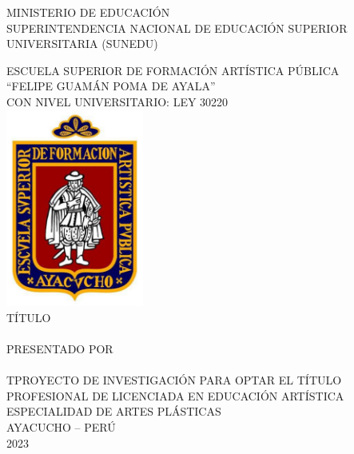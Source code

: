 \documentclass[12pt,a4paper]{article}
\begin{document}
\setlength{\abovecaptionskip}{0pt}
\setlength{\belowcaptionskip}{0pt}

\thispagestyle{empty}

	{\normalsize\centering\thispagestyle{empty} MINISTERIO DE EDUCACIÓN{}\\  SUPERINTENDENCIA NACIONAL DE EDUCACIÓN SUPERIOR UNIVERSITARIA (SUNEDU)\\ \vspace{0.65cm}
	
	{\large ESCUELA SUPERIOR DE FORMACIÓN ARTÍSTICA PÚBLICA\\ ``FELIPE GUAMÁN POMA DE AYALA''}\\  {\scriptsize CON NIVEL UNIVERSITARIO: LEY 30220}\\
	\vspace{0.65cm}  \includegraphics[height=6.5cm]{logo}\\
	\vspace{0.65cm}  {\large TÍTULO}\\ 
	\vspace{0.65cm}   
	\MakeUppercase{\Large\titulo}\\ 
	\vspace{0.65cm}   {\large PRESENTADO POR \\ 
		\vspace{0.65cm}  \autor}\\ 
	\vspace{0.65cm} \large TPROYECTO DE INVESTIGACIÓN PARA OPTAR EL TÍTULO PROFESIONAL DE LICENCIADA EN EDUCACIÓN ARTÍSTICA\\ 
	\vspace{0.3cm}  ESPECIALIDAD DE ARTES PLÁSTICAS\\ 
	\vspace{0.3cm}  AYACUCHO -- PERÚ\\ 
	\vfill
	{ 2023}
	
}
\end{document}
